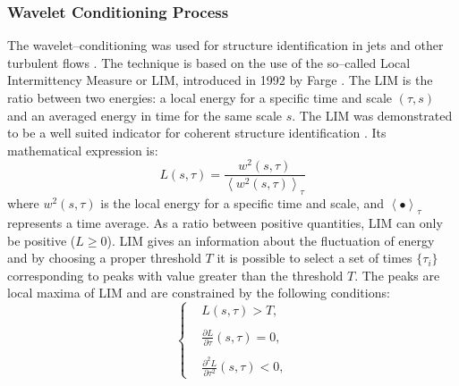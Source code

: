 \subsubsection{Wavelet Conditioning Process}
The wavelet--conditioning was used for structure identification in jets and other turbulent flows \cite{Camussi1997,Camussi1997b,Guj1999,Camussi2002,Guj2003}.
The technique is based on the use of the so--called Local Intermittency Measure or LIM, introduced in 1992 by Farge \etal \cite{Farge1992}.
The LIM is the ratio between two energies: a local energy for a specific time and scale $(\tau, s)$ and an averaged energy in time for the same scale $s$.
The LIM was demonstrated to be a well suited indicator for coherent structure identification \cite{Camussi1997}. Its mathematical expression is:
\begin{equation}
	\label{eqn:LIM}
	L(s, \tau) = \frac{w^{2}(s, \tau)}{\left<w^{2}(s, \tau)\right>_{\tau}}
\end{equation}
where $w^{2}(s, \tau)$ is the local energy for a specific time and scale, and $\left< \bullet \right>_{\tau}$ represents a time average.
As a ratio between positive quantities, LIM can only be positive ($L \geqslant 0 $). LIM gives an information about the fluctuation of energy and by choosing a proper threshold $T$ it is possible to select a set of times $\{\tau_{i}\}$ corresponding to peaks with value greater than the threshold $T$.
The peaks are local maxima of LIM and are constrained by the following conditions:
\begin{equation} \label{eqn:thresholdLIM}
    \begin{cases}
        &L(s, \tau) > T,\\
        \\
        &\frac{\partial L}{\partial \tau}(s, \tau) = 0,\\
        \\
        &\frac{\partial^{2} L}{\partial \tau^{2}}(s, \tau) < 0,
    \end{cases}
\end{equation}


